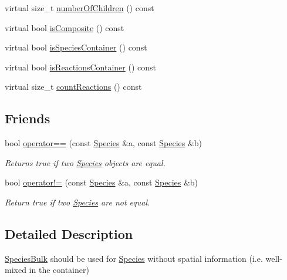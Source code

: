 \begin{DoxyCompactItemize}
\item 
virtual size\-\_\-t \hyperlink{classchem_1_1Component_a720ec4ef4aaadfec3e47c31451d28637}{number\-Of\-Children} () const 
\item 
virtual bool \hyperlink{classchem_1_1Component_af2c73f75f937d457a55c1e0120833cb8}{is\-Composite} () const 
\item 
virtual bool \hyperlink{classchem_1_1Component_a3c0f652fe5b6910f07c046fe0190b7b5}{is\-Species\-Container} () const 
\item 
virtual bool \hyperlink{classchem_1_1Component_a8c79ee4335fadfcef56b14a62b742457}{is\-Reactions\-Container} () const 
\item 
virtual size\-\_\-t \hyperlink{classchem_1_1Component_ab061b8b7d97db554af402ebb9723dc4c}{count\-Reactions} () const 
\end{DoxyCompactItemize}
\subsection*{Friends}
\begin{DoxyCompactItemize}
\item 
bool \hyperlink{classchem_1_1Species_a22987c5719b74c50465256ea5b9d80bf}{operator==} (const \hyperlink{classchem_1_1Species}{Species} \&a, const \hyperlink{classchem_1_1Species}{Species} \&b)
\begin{DoxyCompactList}\small\item\em Returns true if two \hyperlink{classchem_1_1Species}{Species} objects are equal. \end{DoxyCompactList}\item 
bool \hyperlink{classchem_1_1Species_aff630d716711fbbab3bc7f598230316b}{operator!=} (const \hyperlink{classchem_1_1Species}{Species} \&a, const \hyperlink{classchem_1_1Species}{Species} \&b)
\begin{DoxyCompactList}\small\item\em Return true if two \hyperlink{classchem_1_1Species}{Species} are not equal. \end{DoxyCompactList}\end{DoxyCompactItemize}


\subsection{Detailed Description}
\hyperlink{classchem_1_1SpeciesBulk}{Species\-Bulk} should be used for \hyperlink{classchem_1_1Species}{Species} without spatial information (i.\-e. well-\/mixed in the container) 


